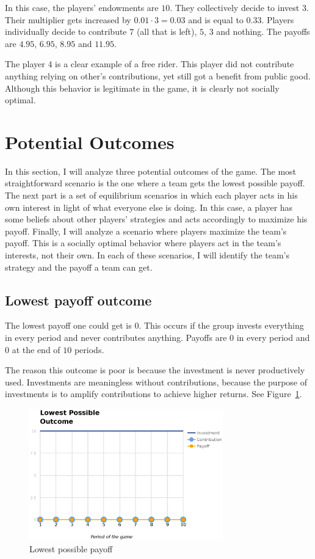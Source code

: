 		In this case, the players' endowments are $10$. They collectively decide to invest $3$. Their multiplier gets increased by $0.01 \cdot 3 = 0.03$ and is equal to $0.33$. Players individually decide to contribute $7$ (all that is left), $5$, $3$ and nothing. The payoffs are $4.95$, $6.95$, $8.95$ and $11.95$.

		The player $4$ is a clear example of a free rider. This player did not contribute anything relying on other's contributions, yet still got a benefit from public good. Although this behavior is legitimate in the game, it is clearly not socially optimal.

\section{Potential Outcomes}

	In this section, I will analyze three potential outcomes of the game. The most straightforward scenario is the one where a team gets the lowest possible payoff. The next part is a set of equilibrium scenarios in which each player acts in his own interest in light of what everyone else is doing. In this case, a player has some beliefs about other players' strategies and acts accordingly to maximize his payoff. Finally, I will analyze a scenario where players maximize the team's payoff. This is a socially optimal behavior where players act in the team's interests, not their own. In each of these scenarios, I will identify the team's strategy and the payoff a team can get.

		
	\subsection{Lowest payoff outcome}
	
		The lowest payoff one could get is $0$. This occurs if the group invests everything in every period and never contributes anything. Payoffs are $0$ in every period and $0$ at the end of $10$ periods.
	
		The reason this outcome is poor is because the investment is never productively used. Investments are meaningless without contributions, because the purpose of investments is to amplify contributions to achieve higher returns. See Figure~\ref{fig:lowest}.

		\begin{figure}
			\begin{center}
				\includegraphics[width=8.4cm]{resources/eps/lowest.eps}
				\caption{Lowest possible payoff} 
				\label{fig:lowest}
			\end{center}
		\end{figure}
		
